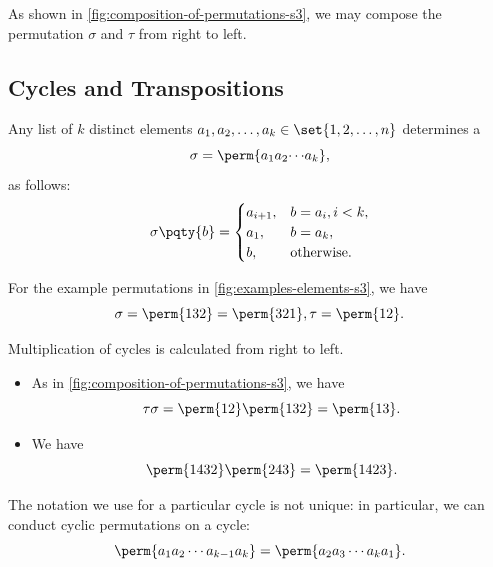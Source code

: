 \begin{example*}
    As shown in \autoref{fig:composition-of-permutations-s3}, we may compose the permutation \(\sigma\) and \(\tau\) from right to left.
\end{example*}

\subsection{Cycles and Transpositions}
\label{sec:cycles-and-transpositions}

\begin{definition}[Cycles]
    \label{def:cycles}%
    Any list of \(k\) distinct elements \(a_1, a_2, \ldots, a_k \in \set{1, 2, \ldots, n}\) determines a 
    \[
        \sigma = \perm{{a_1}{a_2}{\cdots}{a_k}},
    \]
    as follows:
    \[
        \sigma\pqty{b} = \begin{cases}
            a_{i + 1}, & b = a_i, i < k, \\
            a_1, & b = a_k, \\
            b, & \text{otherwise}.
        \end{cases}
    \]
\end{definition}

\begin{example*}
    For the example permutations in \autoref{fig:examples-elements-s3}, we have
    \[
        \sigma = \perm{132} = \perm{321}, \tau = \perm{12}.
    \]
\end{example*}

Multiplication of cycles is calculated from right to left.

\begin{examples*}
    \begin{itemize}
        \item As in \autoref{fig:composition-of-permutations-s3}, we have
        \[
            \tau \sigma = \perm{12}\perm{132} = \perm{13}.
        \]
        \item We have
        \[
            \perm{1432}\perm{243} = \perm{1423}.
        \]
    \end{itemize}
\end{examples*}

The notation we use for a particular cycle is not unique: in particular, we can conduct cyclic permutations on a cycle:
\[
    \perm{{a_1} {a_2} \cdots {a_{k - 1}} {a_k}} = \perm{{a_2} {a_3} \cdots {a_k} {a_1}}.
\]

